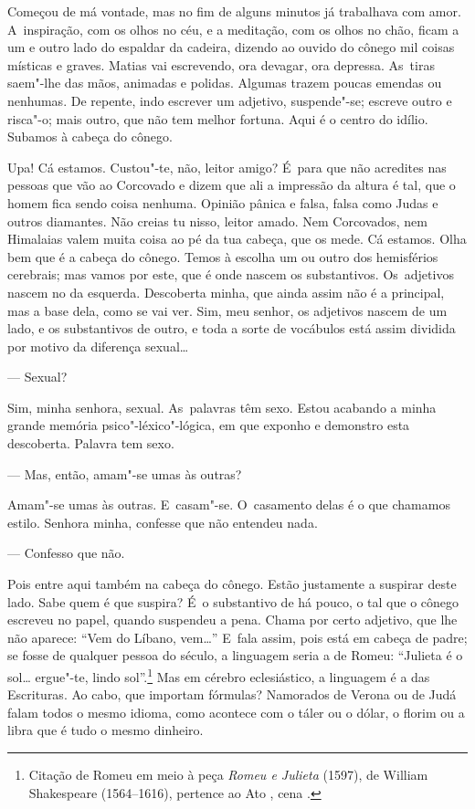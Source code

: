 \begin{linenumbers}
Começou de má vontade, mas no fim de alguns minutos já trabalhava com
amor. A~inspiração, com os olhos no céu, e a meditação, com os olhos no
chão, ficam a um e outro lado do espaldar da cadeira, dizendo ao ouvido
do cônego mil coisas místicas e graves. Matias vai escrevendo, ora
devagar, ora depressa. As~tiras saem"-lhe das mãos, animadas e polidas.
Algumas trazem poucas emendas ou nenhumas. De repente, indo escrever um
adjetivo, suspende"-se; escreve outro e risca"-o; mais outro, que não tem
melhor fortuna. Aqui é o centro do idílio. Subamos à cabeça do cônego.

Upa! Cá estamos. Custou"-te, não, leitor amigo? É~para que não acredites
nas pessoas que vão ao Corcovado e dizem que ali a impressão da altura é
tal, que o homem fica sendo coisa nenhuma. Opinião pânica e falsa, falsa
como Judas e outros diamantes. Não creias tu nisso, leitor amado. Nem
Corcovados, nem Himalaias valem muita coisa ao pé da tua cabeça, que os
mede. Cá estamos. Olha bem que é a cabeça do cônego. Temos à escolha um
ou outro dos hemisférios cerebrais; mas vamos por este, que é onde
nascem os substantivos. Os~adjetivos nascem no da esquerda. Descoberta
minha, que ainda assim não é a principal, mas a base dela, como se vai
ver. Sim, meu senhor, os adjetivos nascem de um lado, e os substantivos
de outro, e toda a sorte de vocábulos está assim dividida por motivo da
diferença sexual\ldots{}

--- Sexual?

Sim, minha senhora, sexual. As~palavras têm sexo. Estou acabando a minha
grande memória psico"-léxico"-lógica, em que exponho e demonstro esta
descoberta. Palavra tem sexo.

--- Mas, então, amam"-se umas às outras?

Amam"-se umas às outras. E~casam"-se. O~casamento delas é o que chamamos
estilo. Senhora minha, confesse que não entendeu nada.

--- Confesso que não.

Pois entre aqui também na cabeça do cônego. Estão justamente a suspirar
deste lado. Sabe quem é que suspira? É~o substantivo de há pouco, o tal
que o cônego escreveu no papel, quando suspendeu a pena. Chama por certo
adjetivo, que lhe não aparece: ``Vem do Líbano, vem\ldots{}'' E~fala assim,
pois está em cabeça de padre; se fosse de qualquer pessoa do século, a
linguagem seria a de Romeu: ``Julieta é o sol\ldots{} ergue"-te, lindo
sol''.\footnote{Citação de Romeu em meio à peça \emph{Romeu e Julieta}
  (1597), de William Shakespeare (1564--1616), pertence ao Ato , cena
  .} Mas em cérebro eclesiástico, a linguagem é a das Escrituras. Ao
cabo, que importam fórmulas? Namorados de Verona ou de Judá falam todos
o mesmo idioma, como acontece com o táler ou o dólar, o florim ou a
libra que é tudo o mesmo dinheiro.


\end{linenumbers}
